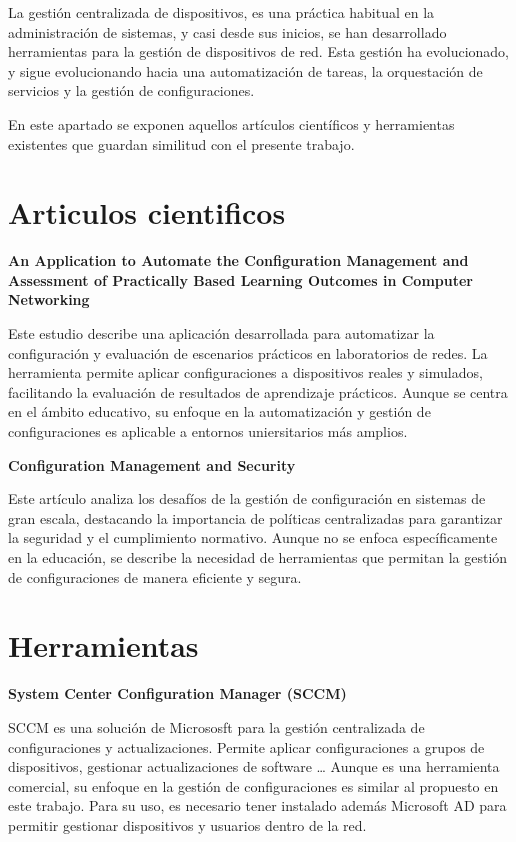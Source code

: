 
La gestión centralizada de dispositivos, es una práctica habitual en la administración de sistemas,
y casi desde sus inicios, se han desarrollado herramientas para la gestión de dispositivos de red.
Esta gestión ha evolucionado, y sigue evolucionando hacia una automatización de tareas, la orquestación de servicios y
la gestión de configuraciones.

En este apartado se exponen aquellos artículos científicos y herramientas existentes que guardan similitud con
el presente trabajo.

\section{Articulos cientificos}\label{sec:articulos-cientificos}

\textbf{An Application to Automate the Configuration Management and Assessment of Practically Based Learning Outcomes in Computer Networking }

Este estudio describe una aplicación desarrollada para automatizar la configuración y evaluación de escenarios prácticos
en laboratorios de redes\cite{malliarakis2019application}.
La herramienta permite aplicar configuraciones a dispositivos reales y simulados, facilitando  la evaluación de
resultados de aprendizaje prácticos.
Aunque se centra en el ámbito educativo, su enfoque en la automatización y gestión de configuraciones es aplicable a
entornos uniersitarios más amplios.

\textbf{Configuration Management and Security }

Este artículo\cite{bellovin2001configuration} analiza los desafíos de la gestión de configuración en sistemas de gran
escala, destacando la importancia de políticas centralizadas para garantizar la seguridad y el cumplimiento normativo.
Aunque no se enfoca específicamente en la educación, se describe la necesidad de herramientas que permitan la gestión
de configuraciones de manera eficiente y segura.

\section{Herramientas}\label{sec:herramientas}

\textbf{System Center Configuration Manager (SCCM)}

SCCM\cite{microsoftConfigMgr} es una solución de Micrososft para la gestión centralizada de configuraciones y
actualizaciones.
Permite aplicar configuraciones a grupos de dispositivos, gestionar actualizaciones de software \ldots
Aunque es una herramienta comercial, su enfoque en la gestión de configuraciones es similar al
propuesto en este trabajo.
Para su uso, es necesario tener instalado además Microsoft AD para permitir gestionar dispositivos y usuarios dentro
de la red.

